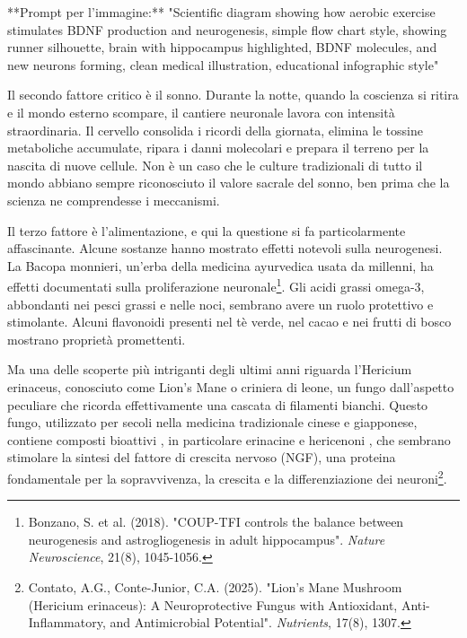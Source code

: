 \begin{center}  
  \label{fig:bdnf_meccanismo}  
\end{center}

**Prompt per l'immagine:** "Scientific diagram showing how aerobic exercise stimulates BDNF production and neurogenesis, simple flow chart style, showing runner silhouette, brain with hippocampus highlighted, BDNF molecules, and new neurons forming, clean medical illustration, educational infographic style"

Il secondo fattore critico è il sonno. Durante la notte, quando la coscienza si ritira e il mondo esterno scompare, il cantiere neuronale lavora con intensità straordinaria. Il cervello consolida i ricordi della giornata, elimina le tossine metaboliche accumulate, ripara i danni molecolari e prepara il terreno per la nascita di nuove cellule. Non è un caso che le culture tradizionali di tutto il mondo abbiano sempre riconosciuto il valore sacrale del sonno, ben prima che la scienza ne comprendesse i meccanismi.

Il terzo fattore è l'alimentazione, e qui la questione si fa particolarmente affascinante. Alcune sostanze hanno mostrato effetti notevoli sulla neurogenesi. La Bacopa monnieri, un'erba della medicina ayurvedica usata da millenni, ha effetti documentati sulla proliferazione neuronale\footnote{Bonzano, S. et al. (2018). "COUP-TFI controls the balance between neurogenesis and astrogliogenesis in adult hippocampus". \textit{Nature Neuroscience}, 21(8), 1045-1056.}. Gli acidi grassi omega-3, abbondanti nei pesci grassi e nelle noci, sembrano avere un ruolo protettivo e stimolante. Alcuni flavonoidi presenti nel tè verde, nel cacao e nei frutti di bosco mostrano proprietà promettenti.

Ma una delle scoperte più intriganti degli ultimi anni riguarda l'Hericium erinaceus, conosciuto come Lion's Mane o criniera di leone, un fungo dall'aspetto peculiare che ricorda effettivamente una cascata di filamenti bianchi. Questo fungo, utilizzato per secoli nella medicina tradizionale cinese e giapponese, contiene composti bioattivi , in particolare erinacine e hericenoni , che sembrano stimolare la sintesi del fattore di crescita nervoso (NGF), una proteina fondamentale per la sopravvivenza, la crescita e la differenziazione dei neuroni\footnote{Contato, A.G., Conte-Junior, C.A. (2025). "Lion's Mane Mushroom (Hericium erinaceus): A Neuroprotective Fungus with Antioxidant, Anti-Inflammatory, and Antimicrobial Potential". \textit{Nutrients}, 17(8), 1307.}.

